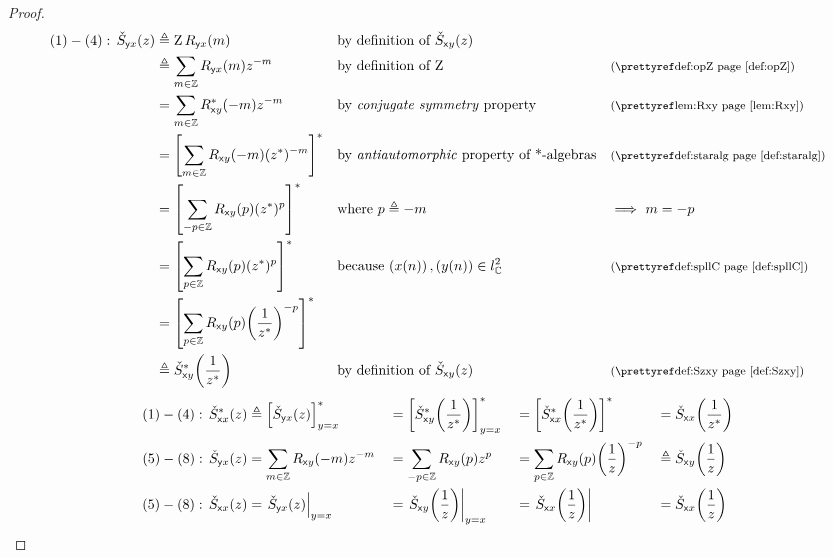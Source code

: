 \begin{proof}
\begin{align*}
  (1)-(4):\,\Szyx(z)
     &\eqd \opZ \Ryx(m)
    && \text{by definition of $\Szxy(z)$}                          && %
  \\&\eqd \sum_{m\in\Z}\Ryx(m) z^{-m}
    && \text{by definition of $\opZ$}                              && \text{\xref{def:opZ}}
  \\&= \sum_{m\in\Z} \Rxy^\ast(-m) z^{-m}
    && \text{by \prope{conjugate symmetry} property}               && \text{\xref{lem:Rxy}}
  \\&= \brs{\sum_{m\in\Z} \Rxy(-m) (z^\ast)^{-m}}^\ast
    && \text{by \prope{antiautomorphic} property of *-algebras}    && \text{\xref{def:staralg}}
  \\&= \brs{\sum_{-p\in\Z} \Rxy(p) (z^\ast)^{p}}^\ast
    && \text{where $p\eqd -m$}                                     && \text{$\implies$ $m=-p$}
  \\&= \brs{\sum_{p\in\Z} \Rxy(p) (z^\ast)^{p}}^\ast
    && \text{because $\seqn{\rvx(n)},\seqn{\rvy(n)}\in\spllC$}     && \text{\xref{def:spllC}}
  \\&= \brs{\sum_{p\in\Z} \Rxy(p) \brp{\frac{1}{z^\ast}}^{-p}}^\ast
  \\&\eqd \Szxy^\ast\brp{\frac{1}{z^\ast}}
    && \text{by definition of $\Szxy(z)$}                          && \text{\xref{def:Szxy}}
\end{align*}
\begin{align*}
  (1)-(4):\,\check{S}_{{\mathsf xx}}^\ast(z)
    &\triangleq {\left[\check{S}_{{\mathsf yx}}(z)\right]}^\ast_{y=x}
   &&= {\left[\check{S}_{{\mathsf xy}}^\ast{\left(\frac{1}{z^\ast}\right)}\right]}^\ast_{y=x}
   &&= {\left[\check{S}_{{\mathsf xx}}^\ast{\left(\frac{1}{z^\ast}\right)}\right]}^\ast
   &&= \check{S}_{{\mathsf xx}}{\left(\frac{1}{z^\ast}\right)}
  \\
  (5)-(8):\,\check{S}_{{\mathsf yx}}(z)
    &= \sum_{m\in\mathbb{Z}} R_{{\mathsf xy}}(-m) z^{-m}
   &&= \sum_{-p\in\mathbb{Z}} R_{{\mathsf xy}}(p) z^{p}
   &&= \sum_{p\in\mathbb{Z}} R_{{\mathsf xy}}(p) {\left(\frac{1}{z}\right)}^{-p}
   &&\triangleq \check{S}_{{\mathsf xy}}{\left(\frac{1}{z}\right)}
  \\
  (5)-(8):\,\check{S}_{{\mathsf xx}}(z)
    &= \left.\check{S}_{{\mathsf yx}}(z)\right|_{y=x}
   &&= \left.\check{S}_{{\mathsf xy}}{\left(\frac{1}{z}\right)}\right|_{y=x}
   &&= \left.\check{S}_{{\mathsf xx}}{\left(\frac{1}{z}\right)}\right|
   &&= \check{S}_{{\mathsf xx}}{\left(\frac{1}{z}\right)}
\end{align*}
\end{proof}

